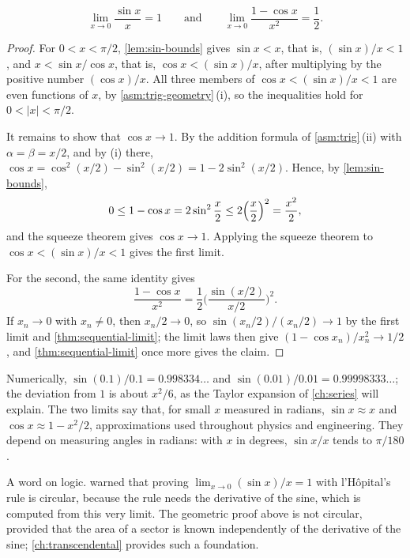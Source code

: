 \begin{proposition}
\label{prop:sin-limit}
\[
\lim_{x\to0}\frac{\sin x}x=1\qquad\text{and}\qquad\lim_{x\to0}\frac{1-\cos x}{x^2}=\frac12 .
\]
\end{proposition}

\begin{proof}
For $0<x<\pi/2$, \cref{lem:sin-bounds} gives $\sin x<x$, that is, $(\sin x)/x<1$, and $x<\sin x/\cos x$, that is, $\cos x<(\sin x)/x$, after multiplying by the positive number $(\cos x)/x$. All three members of $\cos x<(\sin x)/x<1$ are even functions of $x$, by \cref{asm:trig-geometry}\,(i), so the inequalities hold for $0<|x|<\pi/2$.

It remains to show that $\cos x\to1$. By the addition formula of \cref{asm:trig}\,(ii) with $\alpha=\beta=x/2$, and by (i) there, $\cos x=\cos^2(x/2)-\sin^2(x/2)=1-2\sin^2(x/2)$. Hence, by \cref{lem:sin-bounds},
\begin{equation}
0\le1-\cos x=2\sin^2\frac x2\le2\Bigl(\frac x2\Bigr)^2=\frac{x^2}2 ,
\label{eq:one-minus-cos}
\end{equation}
and the squeeze theorem gives $\cos x\to1$. Applying the squeeze theorem to $\cos x<(\sin x)/x<1$ gives the first limit.

For the second, the same identity gives
\[
\frac{1-\cos x}{x^2}=\frac12\biggl(\frac{\sin(x/2)}{x/2}\biggr)^2 .
\]
If $x_n\to0$ with $x_n\ne0$, then $x_n/2\to0$, so $\sin(x_n/2)/(x_n/2)\to1$ by the first limit and \cref{thm:sequential-limit}; the limit laws then give $(1-\cos x_n)/x_n^2\to1/2$, and \cref{thm:sequential-limit} once more gives the claim.
\end{proof}

Numerically, $\sin(0.1)/0.1=0.998334\ldots$ and $\sin(0.01)/0.01=0.99998333\ldots$; the deviation from $1$ is about $x^2/6$, as the Taylor expansion of \cref{ch:series} will explain. The two limits say that, for small $x$ measured in radians, $\sin x\approx x$ and $\cos x\approx1-x^2/2$, approximations used throughout physics and engineering. They depend on measuring angles in radians: with $x$ in degrees, $\sin x/x$ tends to $\pi/180$.

A word on logic.  warned that proving $\lim_{x\to0}(\sin x)/x=1$ with l'H\^opital's rule is circular, because the rule needs the derivative of the sine, which is computed from this very limit. The geometric proof above is not circular, provided that the area of a sector is known independently of the derivative of the sine; \cref{ch:transcendental} provides such a foundation.

